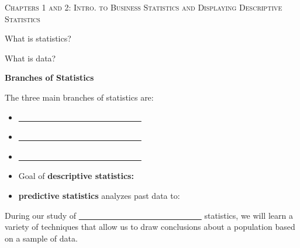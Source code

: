 \documentclass[12pt, letterpaper]{article}
\theoremstyle{definition}
\begin{document}


\begin{center}

{\LARGE \textsc{Chapters 1 and 2:  Intro. to Business Statistics and Displaying Descriptive Statistics}}
\end{center}

\begin{question}
What is statistics?
\end{question}

\vfill

\begin{question}
What is data?
\end{question}

\vfill

\begin{statement}
\textbf{Branches of Statistics}

The three main branches of statistics are:
\begin{itemize}
\item \underline{~~~~~~~~~~~~~~~~~~~~~~~~~~~~~~}
\vspace*{.2in}
\item \underline{~~~~~~~~~~~~~~~~~~~~~~~~~~~~~~}
\vspace*{.2in}
\item \underline{~~~~~~~~~~~~~~~~~~~~~~~~~~~~~~}
\vspace*{.2in}
\end{itemize}
\end{statement}

\vspace{.2in}

\begin{statement}
\begin{itemize}
\item Goal of \textbf{descriptive statistics:}
\vspace*{.3in}
\item \textbf{predictive statistics} analyzes past data to:
\vspace*{.3in}
\end{itemize}
\end{statement}

\begin{statement}
During our study of \underline{~~~~~~~~~~~~~~~~~~~~~~~~~~~~~~} statistics, we will learn a variety of techniques that allow us to draw conclusions about a population based on a sample of data.
\end{statement}
\end{document}
